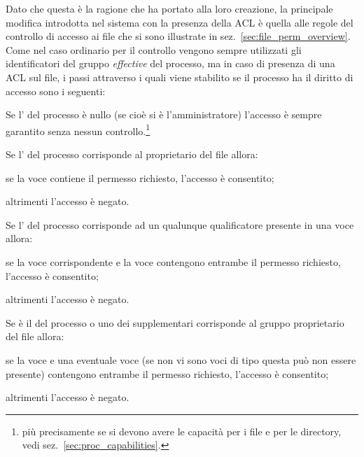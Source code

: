 Dato che questa è la ragione che ha portato alla loro creazione, la principale
modifica introdotta nel sistema con la presenza della ACL è quella alle regole
del controllo di accesso ai file che si sono illustrate in
sez.~\ref{sec:file_perm_overview}.  Come nel caso ordinario per il controllo
vengono sempre utilizzati gli identificatori del gruppo \textit{effective} del
processo, ma in caso di presenza di una ACL sul file, i passi attraverso i
quali viene stabilito se il processo ha il diritto di accesso sono i seguenti:
\begin{enumerate*}
\item Se l' del processo è nullo (se cioè si è l'amministratore)
  l'accesso è sempre garantito senza nessun controllo.\footnote{più
    precisamente se si devono avere le capacità  per
    i file e  per le directory, vedi
    sez.~\ref{sec:proc_capabilities}.}
\item Se l' del processo corrisponde al proprietario del file allora:
  \begin{itemize*}
  \item se la voce  contiene il permesso richiesto,
    l'accesso è consentito;
  \item altrimenti l'accesso è negato.
  \end{itemize*}
\item Se l' del processo corrisponde ad un qualunque qualificatore
  presente in una voce  allora:
  \begin{itemize*}
  \item se la voce  corrispondente e la voce
     contengono entrambe il permesso richiesto, l'accesso è
    consentito;
  \item altrimenti l'accesso è negato.
  \end{itemize*}
\item Se è il  del processo o uno dei  supplementari
  corrisponde al gruppo proprietario del file allora: 
  \begin{itemize*}
  \item se la voce  e una eventuale voce
     (se non vi sono voci di tipo  questa
    può non essere presente) contengono entrambe il permesso richiesto,
    l'accesso è consentito;
  \item altrimenti l'accesso è negato.
  \end{itemize*}

\end{enumerate*}
